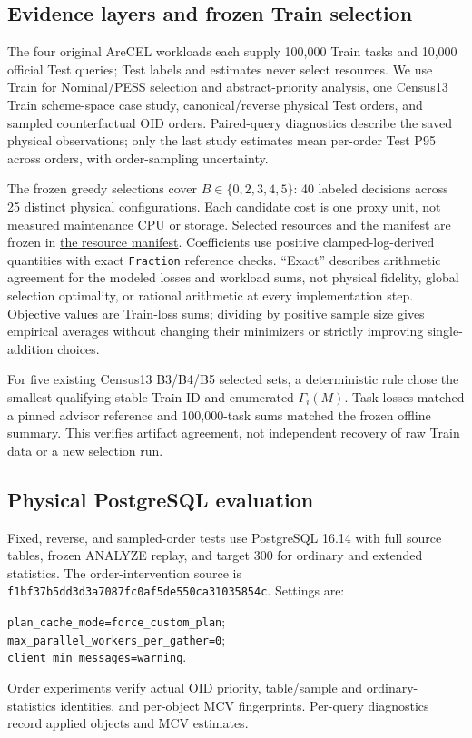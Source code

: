 \documentclass[sigconf, nonacm]{acmart}
\begin{document}
\subsection{Evidence layers and frozen Train selection}
The four original AreCEL workloads \cite{wang2021arecel} each
supply 100,000 Train tasks and 10,000 official Test queries; Test
labels and estimates never select resources. We use Train for
Nominal/PESS selection and abstract-priority analysis, one
Census13 Train scheme-space case study, canonical/reverse physical
Test orders, and sampled counterfactual OID orders. Paired-query
diagnostics describe the saved physical observations; only the last
study estimates mean per-order Test P95 across orders, with
order-sampling uncertainty.

The frozen greedy selections cover \(B\in\{0,2,3,4,5\}\): 40 labeled
decisions across 25 distinct physical configurations. Each candidate
cost is one proxy unit, not measured maintenance CPU or storage.
Selected resources and the manifest are frozen in
\href{https://github.com/1951123/ess-research/blob/main/experiments/add-only-greedy-issue99/frozen-train-resources-issue96-v1.json}{the resource manifest}.
Coefficients use positive clamped-log-derived quantities with exact
\texttt{Fraction} reference checks. “Exact” describes arithmetic
agreement for the modeled losses and workload sums, not physical
fidelity, global selection optimality, or rational arithmetic at every
implementation step. Objective values are Train-loss sums; dividing
by positive sample size gives empirical averages without changing
their minimizers or strictly improving single-addition choices.

For five existing Census13 B3/B4/B5 selected sets, a deterministic
rule chose the smallest qualifying stable Train ID and enumerated
\(\Gamma_i(M)\). Task losses matched a pinned advisor reference and
100,000-task sums matched the frozen offline summary. This verifies
artifact agreement, not independent recovery of raw Train data or a
new selection run.

\subsection{Physical PostgreSQL evaluation}
Fixed, reverse, and sampled-order tests use PostgreSQL 16.14 with
full source tables, frozen ANALYZE replay, and target 300 for ordinary
and extended statistics. The order-intervention source is
\texttt{f1bf37b5dd3d3a7087fc\allowbreak 0af5de550ca31035854c}.
Settings are:
{\raggedright
\texttt{plan\_cache\_mode=force\_custom\_plan};\\
\texttt{max\_parallel\_workers\_per\_gather=0};\\
\texttt{client\_min\_messages=warning}.\par}
Order experiments verify actual OID priority, table/sample and
ordinary-statistics identities, and per-object MCV fingerprints.
Per-query diagnostics record applied objects and MCV estimates.
\end{document}

